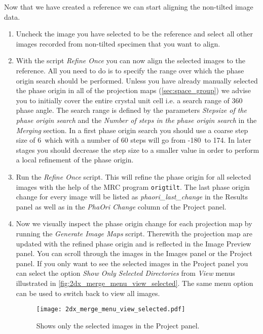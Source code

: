 Now that we have created a  reference we can start aligning the non-tilted image data.

\begin{enumerate}
	\item Uncheck the image you have selected to be the reference and select all other images recorded from non-tilted specimen that you want to align.
	\item With the script \textit{Refine Once} you can now align the selected images to the reference. All you need to do is to specify the range over which the phase origin search should be performed. Unless you have already manually selected the phase origin in all of the projection maps (\autoref{sec:space_group}) we advise you to initially cover the entire crystal unit cell i.e. a search range of 360{\textdegree} phase angle. The search range is defined by the parameters \textit{Stepsize of the phase origin search} and the \textit{Number of steps in the phase origin search} in the \textit{Merging} section. In a first phase origin search you should use a coarse step size of 6\textdegree~which with a number of 60 steps will go from -180\textdegree~to 174\textdegree. In later stages you should decrease the step size to a smaller value in order to perform a local refinement of the phase origin.
	\item Run the \textit{Refine Once} script. This will refine the phase origin for all selected images with the help of the MRC program \texttt{origtilt}. The last phase origin change for every image will be listed as \textit{phaori\_last\_change} in the Results panel as well as in the \textit{PhaOri Change} column of the Project panel.
	\item Now we visually inspect the phase origin change for each projection map by running the \textit{Generate Image Maps} script. Therewith the projection map are updated with the refined phase origin and is reflected in the Image Preview panel. You can scroll through the images in the Images panel or the Project panel. If you only want to see the selected images in the Project panel you can select the option \textit{Show Only Selected Directories} from \textit{View} menus illustrated in \autoref{fig:2dx_merge_menu_view_selected}. The same menu option can be used to switch back to view all images.
	
	\begin{figure}[H]
		\centering
		\texttt{[image: 2dx\_merge\_menu\_view\_selected.pdf]}
		\caption{Shows only the selected images in the Project panel.}
		\label{fig:2dx_merge_menu_view_selected}
	\end{figure}
	

\end{enumerate}
